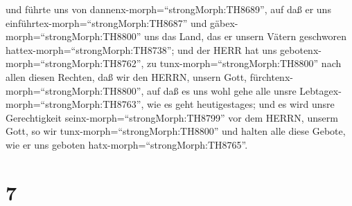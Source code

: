 und führte uns von dannenx-morph=``strongMorph:TH8689'', auf daß er uns
einführtex-morph=``strongMorph:TH8687'' und
gäbex-morph=``strongMorph:TH8800'' uns das Land, das er unsern Vätern
geschworen hattex-morph=``strongMorph:TH8738'';  und der
HERR hat uns gebotenx-morph=``strongMorph:TH8762'', zu
tunx-morph=``strongMorph:TH8800'' nach allen diesen Rechten, daß wir den
HERRN, unsern Gott, fürchtenx-morph=``strongMorph:TH8800'', auf daß es
uns wohl gehe alle unsre Lebtagex-morph=``strongMorph:TH8763'', wie es
geht heutigestages;  und es wird unsre Gerechtigkeit
seinx-morph=``strongMorph:TH8799'' vor dem HERRN, unserm Gott, so wir
tunx-morph=``strongMorph:TH8800'' und halten alle diese Gebote, wie er
uns geboten hatx-morph=``strongMorph:TH8765''.

\hypertarget{section-6}{%
\section{7}\label{section-6}}


